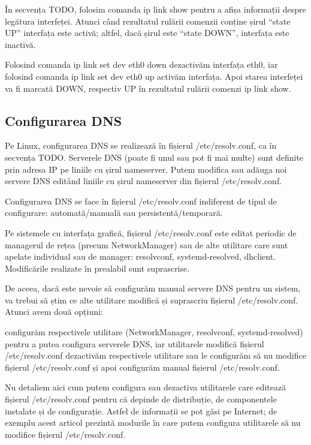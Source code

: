 În secvența TODO, folosim comanda ip link show pentru a afișa informații despre legătura interfeței. Atunci când rezultatul rulării comenzii conține șirul “state UP” interfața este activă; altfel, dacă șirul este “state DOWN”, interfața este inactivă.

Folosind comanda ip link set dev eth0 down dezactivăm interfața eth0, iar folosind comanda ip link set dev eth0 up activăm interfața. Apoi starea interfeței va fi marcată DOWN, respectiv UP în rezultatul rulării comenzi ip link show.

\subsection{Configurarea DNS}
\label{sec:net:config-dns}

Pe Linux, configurarea DNS se realizează în fișierul /etc/resolv.conf, ca în secvența TODO. Serverele DNS (poate fi unul sau pot fi mai multe) sunt definite prin adresa IP pe liniile cu șirul nameserver. Putem modifica sau adăuga noi servere DNS editând liniile cu șirul nameserver din fișierul /etc/resolv.conf.

Configurarea DNS se face în fișierul /etc/resolv.conf indiferent de tipul de configurare: automată/manuală sau persistentă/temporară.

Pe sistemele cu interfața grafică, fișierul /etc/resolv.conf este editat periodic de managerul de rețea (precum NetworkManager) sau de alte utilitare care sunt apelate individual sau de manager: resolvconf, systemd-resolved, dhclient. Modificările realizate în prealabil sunt suprascrise.

De aceea, dacă este nevoie să configurăm manual servere DNS pentru un sistem, va trebui să știm ce alte utilitare modifică și suprascriu fișierul /etc/resolv.conf. Atunci avem două opțiuni:

configurăm respectivele utilitare (NetworkManager, resolvconf, systemd-resolved) pentru a putea configura serverele DNS, iar utilitarele modifică fișierul /etc/resolv.conf
dezactivăm respectivele utilitare sau le configurăm să nu modifice fișierul /etc/resolv.conf și apoi configurăm manual fișierul /etc/resolv.conf.

Nu detaliem aici cum putem configura sau dezactiva utilitarele care editează fișierul /etc/resolv.conf pentru că depinde de distribuție, de componentele instalate și de configurație. Astfel de informații se pot găsi pe Internet; de exemplu acest articol prezintă modurile în care putem configura utilitarele să nu modifice fișierul /etc/resolv.conf.

